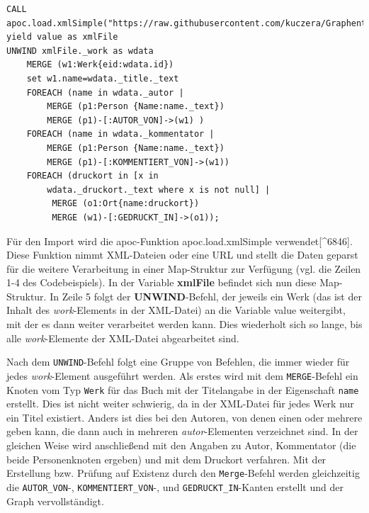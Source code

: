 \documentclass[12pt,ngerman,]{article}
\begin{document}
\begin{verbatim}
CALL apoc.load.xmlSimple("https://raw.githubusercontent.com/kuczera/Graphentechnologien/master/docs/data/kollatz.xml") yield value as xmlFile
UNWIND xmlFile._work as wdata
    MERGE (w1:Werk{eid:wdata.id})
    set w1.name=wdata._title._text
    FOREACH (name in wdata._autor |
        MERGE (p1:Person {Name:name._text})
        MERGE (p1)-[:AUTOR_VON]->(w1) )
    FOREACH (name in wdata._kommentator |
        MERGE (p1:Person {Name:name._text})
        MERGE (p1)-[:KOMMENTIERT_VON]->(w1))
    FOREACH (druckort in [x in
        wdata._druckort._text where x is not null] |
         MERGE (o1:Ort{name:druckort})
         MERGE (w1)-[:GEDRUCKT_IN]->(o1));
\end{verbatim}

Für den Import wird die apoc-Funktion apoc.load.xmlSimple
verwendet{[}\^{}6846{]}. Diese Funktion nimmt XML-Dateien oder eine URL
und stellt die Daten geparst für die weitere Verarbeitung in einer
Map-Struktur zur Verfügung (vgl. die Zeilen 1-4 des Codebeispiels). In
der Variable \textbf{xmlFile} befindet sich nun diese Map-Struktur. In
Zeile 5 folgt der \textbf{UNWIND}-Befehl, der jeweils ein Werk (das ist
der Inhalt des \emph{work}-Elements in der XML-Datei) an die Variable
value weitergibt, mit der es dann weiter verarbeitet werden kann. Dies
wiederholt sich so lange, bis alle \emph{work}-Elemente der XML-Datei
abgearbeitet sind.

Nach dem \texttt{UNWIND}-Befehl folgt eine Gruppe von Befehlen, die
immer wieder für jedes \emph{work}-Element ausgeführt werden. Als erstes
wird mit dem \texttt{MERGE}-Befehl ein Knoten vom Typ \texttt{Werk} für
das Buch mit der Titelangabe in der Eigenschaft \texttt{name} erstellt.
Dies ist nicht weiter schwierig, da in der XML-Datei für jedes Werk nur
ein Titel existiert. Anders ist dies bei den Autoren, von denen einen
oder mehrere geben kann, die dann auch in mehreren
\emph{autor}-Elementen verzeichnet sind. In der gleichen Weise wird
anschließend mit den Angaben zu Autor, Kommentator (die beide
Personenknoten ergeben) und mit dem Druckort verfahren. Mit der
Erstellung bzw. Prüfung auf Existenz durch den \texttt{Merge}-Befehl
werden gleichzeitig die \texttt{AUTOR\_VON}-,
\texttt{KOMMENTIERT\_VON}-, und \texttt{GEDRUCKT\_IN}-Kanten erstellt
und der Graph vervollständigt.
\end{document}
